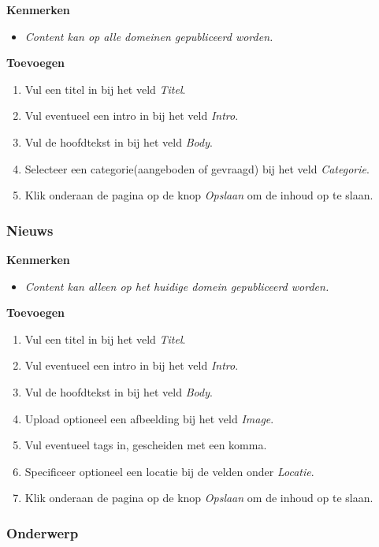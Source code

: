 \textbf{Kenmerken}

\begin{itemize}
\item \emph{Content kan op alle domeinen gepubliceerd worden.}
\end{itemize}

\textbf{Toevoegen}

\begin{enumerate}
\item Vul een titel in bij het veld \emph{Titel}.
\item Vul eventueel een intro in bij het veld \emph{Intro}.
\item Vul de hoofdtekst in bij het veld \emph{Body}.
\item Selecteer een categorie(aangeboden of gevraagd) bij het veld \emph{Categorie}.
\item Klik onderaan de pagina op de knop \emph{Opslaan} om de inhoud op te slaan.
\end{enumerate}

\subsubsection{Nieuws}\label{nieuws}

\textbf{Kenmerken}

\begin{itemize}
\item \emph{Content kan alleen op het huidige domein gepubliceerd worden.}
\end{itemize}

\textbf{Toevoegen}

\begin{enumerate}
\item Vul een titel in bij het veld \emph{Titel}.
\item Vul eventueel een intro in bij het veld \emph{Intro}.
\item Vul de hoofdtekst in bij het veld \emph{Body}.
\item Upload optioneel een afbeelding bij het veld \emph{Image}.
\item Vul eventueel tags in, gescheiden met een komma.
\item Specificeer optioneel een locatie bij de velden onder \emph{Locatie}.
\item Klik onderaan de pagina op de knop \emph{Opslaan} om de inhoud op te slaan.
\end{enumerate}

\subsubsection{Onderwerp}\label{onderwerp}

